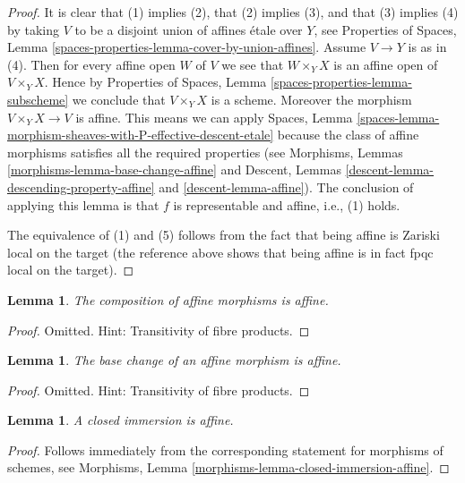 \documentclass{stacks-project}
\theoremstyle{plain}
\newtheorem{lemma}[subsection]{Lemma}
\theoremstyle{definition}
\theoremstyle{remark}
\numberwithin{equation}{subsection}
\begin{document}
\begin{proof}
It is clear that (1) implies (2), that (2) implies (3), and that
(3) implies (4) by taking $V$ to be a disjoint union of affines
\'etale over $Y$, see Properties of Spaces,
Lemma \ref{spaces-properties-lemma-cover-by-union-affines}.
Assume $V \to Y$ is as in (4). Then for every affine open $W$ of $V$ we see
that $W \times_Y X$ is an affine open of $V \times_Y X$. Hence by
Properties of Spaces, Lemma \ref{spaces-properties-lemma-subscheme}
we conclude that $V \times_Y X$ is a scheme. Moreover the morphism
$V \times_Y X \to V$ is affine. This means we can apply
Spaces,
Lemma \ref{spaces-lemma-morphism-sheaves-with-P-effective-descent-etale}
because the class of affine morphisms satisfies all the required
properties (see
Morphisms, Lemmas \ref{morphisms-lemma-base-change-affine} and
Descent, Lemmas \ref{descent-lemma-descending-property-affine}
and \ref{descent-lemma-affine}). The conclusion of applying this lemma
is that $f$ is representable and affine, i.e., (1) holds.

\medskip\noindent
The equivalence of (1) and (5) follows from the fact that being
affine is Zariski local on the target (the reference above shows
that being affine is in fact fpqc local on the target).
\end{proof}

\begin{lemma}
\label{lemma-composition-affine}
The composition of affine morphisms is affine.
\end{lemma}

\begin{proof}
Omitted. Hint: Transitivity of fibre products.
\end{proof}

\begin{lemma}
\label{lemma-base-change-affine}
The base change of an affine morphism is affine.
\end{lemma}

\begin{proof}
Omitted. Hint: Transitivity of fibre products.
\end{proof}

\begin{lemma}
\label{lemma-closed-immersion-affine}
A closed immersion is affine.
\end{lemma}

\begin{proof}
Follows immediately from the corresponding statement for morphisms of
schemes, see Morphisms, Lemma \ref{morphisms-lemma-closed-immersion-affine}.
\end{proof}
\end{document}
